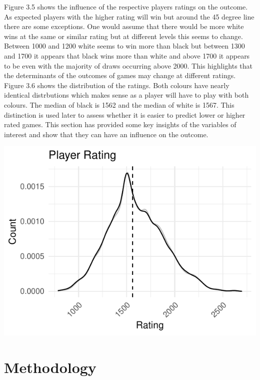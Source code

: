 \documentclass[12pt,preprint, authoryear]{elsarticle}
\let\origfigure\figure
\let\endorigfigure\endfigure
\renewenvironment{figure}[1][2] {
    \expandafter\origfigure\expandafter[H]
} {
    \endorigfigure
}
\numberwithin{equation}{section}
\numberwithin{figure}{section}
\numberwithin{table}{section}
\begin{document}
Figure 3.5 shows the influence of the respective players ratings on the
outcome. As expected players with the higher rating will win but around
the 45 degree line there are some exceptions. One would assume that
there would be more white wins at the same or similar rating but at
different levels this seems to change. Between 1000 and 1200 white seems
to win more than black but between 1300 and 1700 it appears that black
wins more than white and above 1700 it appears to be even with the
majority of draws occurring above 2000. This highlights that the
determinants of the outcomes of games may change at different ratings.
Figure 3.6 shows the distribution of the ratings. Both colours have
nearly identical distrbutions which makes sense as a player will have to
play with both colours. The median of black is 1562 and the median of
white is 1567. This distinction is used later to assess whether it is
easier to predict lower or higher rated games. This section has provided
some key insights of the variables of interest and show that they can
have an influence on the outcome.

\begin{figure}[H]

{\centering \includegraphics{WriteUp_files/figure-latex/hist-1} 

}

\caption{Distribution of Ratings\label{Figure7}}\label{fig:hist}
\end{figure}

\hypertarget{methodology}{%
\section{Methodology}\label{methodology}}
\end{document}
